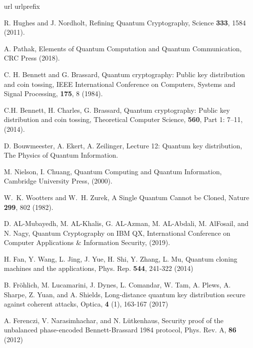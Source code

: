 \documentclass[superscriptaddress,twocolumn,showpacs,prb,floatfix]{revtex4}
\begin{document}
\begin{thebibliography}{10}
\label{SecRef}
\expandafter\ifx\csname url\endcsname\relax
\def\url#1{\texttt{#1}}\fi
\expandafter\ifx\csname urlprefix\endcsname\relax\def\urlprefix{URL }\fi
\providecommand{\bibinfo}[2]{#2}
\providecommand{\eprint}[2][]{\url{#2}}

 R. Hughes and J. Nordholt, Refining Quantum Cryptography, Science \textbf{333}, 1584 (2011).

 A. Pathak, Elements of Quantum Computation and Quantum Communication, CRC Press (2018).

 C. H. Bennett and G. Brassard, Quantum cryptography: Public key distribution and coin tossing, IEEE International Conference on Computers, Systems and Signal Processing, \textbf{175}, 8 (1984).

 C.H. Bennett, H. Charles, G. Brassard, Quantum cryptography: Public key distribution and coin tossing, Theoretical Computer Science, \textbf{560}, Part 1: 7–11, (2014).

 D. Bouwmeester, A. Ekert, A. Zeilinger, Lecture 12: Quantum key distribution, The Physics of Quantum Information.

 M. Nielson, I. Chuang, Quantum Computing and Quantum Information, Cambridge University Press, (2000).

 W.~K. Wootters and W.~H. Zurek, A Single Quantum Cannot be Cloned, Nature \textbf{299}, 802 (1982).

 D. AL-Mubayedh, M. AL-Khalis, G. AL-Azman, M. AL-Abdali, M. AlFosail, and N. Nagy, Quantum Cryptography on IBM QX, International Conference on Computer Applications \& Information Security, (2019). 

 H. Fan, Y. Wang, L. Jing, J. Yue, H. Shi, Y. Zhang, L. Mu, Quantum cloning machines and the applications, Phys. Rep. \textbf{544}, 241-322 (2014)

 B. Fröhlich, M. Lucamarini, J. Dynes, L. Comandar, W. Tam, A. Plews, A. Sharpe, Z. Yuan, and A. Shields, Long-distance quantum key distribution secure against coherent attacks, Optica, \textbf{4} (1), 163-167 (2017)

 A. Ferenczi, V. Narasimhachar, and N. Lütkenhaus, Security proof of the unbalanced phase-encoded Bennett-Brassard 1984 protocol, Phys. Rev. A, \textbf{86} (2012)


\end{thebibliography}
\end{document}
